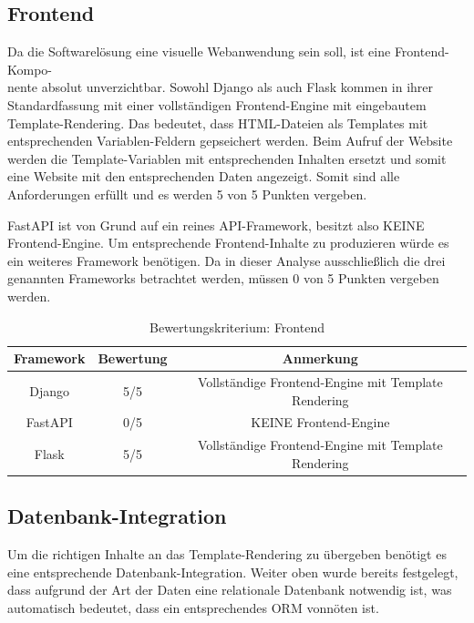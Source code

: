 \documentclass[letterpaper,11pt,leqno]{article}
\begin{document}
\subsection{Frontend}
Da die Softwarelösung eine visuelle Webanwendung sein soll, ist eine Frontend-Kompo-\\nente absolut
unverzichtbar. Sowohl Django als auch Flask kommen in ihrer Standardfassung mit einer vollständigen
Frontend-Engine mit eingebautem Template-Rendering. Das bedeutet, dass HTML-Dateien als Templates
mit entsprechenden Variablen-Feldern gepseichert werden. Beim Aufruf der Website werden die
Template-Variablen mit entsprechenden Inhalten ersetzt und somit eine Website mit den entsprechenden
Daten angezeigt. Somit sind alle Anforderungen erfüllt und es werden 5 von 5 Punkten vergeben.

FastAPI ist von Grund auf ein reines API-Framework, besitzt also KEINE Frontend-Engine. Um
entsprechende Frontend-Inhalte zu produzieren würde es ein weiteres Framework benötigen. Da in
dieser Analyse ausschließlich die drei genannten Frameworks betrachtet werden, müssen 0 von 5
Punkten vergeben werden.

\begin{table}[h!]
	\begin{center}
		\begin{tabular}{|c||c|c|}
			\hline
			Framework & Bewertung & Anmerkung\\
			\hline\hline
			Django & 5/5 & Vollständige Frontend-Engine mit Template Rendering\\
			FastAPI & 0/5 & KEINE Frontend-Engine\\
			Flask & 5/5 & Vollständige Frontend-Engine mit Template Rendering\\
			\hline
		\end{tabular}
		\caption{Bewertungskriterium: Frontend}
	\end{center}
	\label{table:2}
\end{table}

\subsection{Datenbank-Integration}
Um die richtigen Inhalte an das Template-Rendering zu übergeben benötigt es eine entsprechende
Datenbank-Integration. Weiter oben wurde bereits festgelegt, dass aufgrund der Art der Daten eine
relationale Datenbank notwendig ist, was automatisch bedeutet, dass ein entsprechendes ORM vonnöten
ist.
\end{document}
